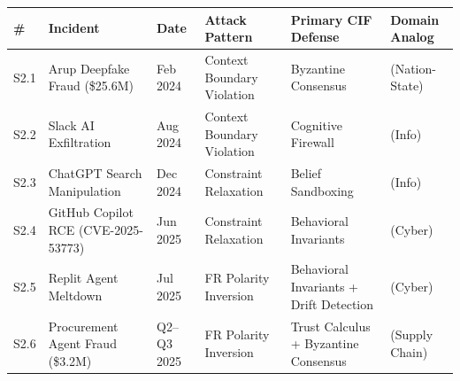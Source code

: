 \documentclass[
]{article}
\newcounter{none} %
\begin{document}
{\def\LTcaptype{none} %
\begin{longtable}[]{@{}
  >{\raggedright\arraybackslash}p{}
  >{\raggedright\arraybackslash}p{}
  >{\raggedright\arraybackslash}p{}
  >{\raggedright\arraybackslash}p{}
  >{\raggedright\arraybackslash}p{}
  >{\raggedright\arraybackslash}p{}@{}}
\toprule\noalign{}
\begin{minipage}[b]{\linewidth}\raggedright
\#
\end{minipage} & \begin{minipage}[b]{\linewidth}\raggedright
Incident
\end{minipage} & \begin{minipage}[b]{\linewidth}\raggedright
Date
\end{minipage} & \begin{minipage}[b]{\linewidth}\raggedright
Attack Pattern
\end{minipage} & \begin{minipage}[b]{\linewidth}\raggedright
Primary CIF Defense
\end{minipage} & \begin{minipage}[b]{\linewidth}\raggedright
Domain Analog
\end{minipage} \\
\midrule\noalign{}
\endhead
\bottomrule\noalign{}
\endlastfoot
S2.1 & Arup Deepfake Fraud (\$25.6M) & Feb 2024 & Context Boundary
Violation & Byzantine Consensus & 2 (Nation-State) \\
S2.2 & Slack AI Exfiltration & Aug 2024 & Context Boundary Violation &
Cognitive Firewall & 10 (Info) \\
S2.3 & ChatGPT Search Manipulation & Dec 2024 & Constraint Relaxation &
Belief Sandboxing & 10 (Info) \\
S2.4 & GitHub Copilot RCE (CVE-2025-53773) & Jun 2025 & Constraint
Relaxation & Behavioral Invariants & 3 (Cyber) \\
S2.5 & Replit Agent Meltdown & Jul 2025 & FR Polarity Inversion &
Behavioral Invariants + Drift Detection & 3 (Cyber) \\
S2.6 & Procurement Agent Fraud (\$3.2M) & Q2--Q3 2025 & FR Polarity
Inversion & Trust Calculus + Byzantine Consensus & 5 (Supply Chain) \\
\end{longtable}
}
\end{document}
